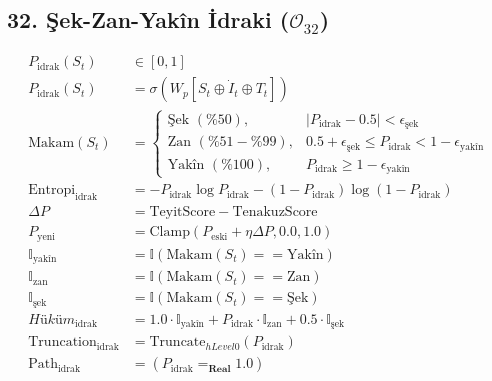\documentclass[11pt, a4paper]{article}
\begin{document}
\subsection{32. Şek-Zan-Yakîn İdraki ($\mathcal{O}_{32}$)}
\begin{align}
P_{\text{idrak}}(S_t) &\in [0, 1] \\
P_{\text{idrak}}(S_t) &= \sigma\left( W_p [S_t \oplus \dot{I}_t \oplus T_t] \right) \\
\text{Makam}(S_t) &= 
\begin{cases}
\text{Şek } (\%50), & |P_{\text{idrak}} - 0.5| < \epsilon_{\text{şek}} \\
\text{Zan } (\%51-\%99), & 0.5 + \epsilon_{\text{şek}} \le P_{\text{idrak}} < 1 - \epsilon_{\text{yakîn}} \\
\text{Yakîn } (\%100), & P_{\text{idrak}} \ge 1 - \epsilon_{\text{yakîn}}
\end{cases} \\
\text{Entropi}_{\text{idrak}} &= -P_{\text{idrak}} \log P_{\text{idrak}} - (1-P_{\text{idrak}}) \log (1-P_{\text{idrak}}) \\
\Delta P &= \text{TeyitScore} - \text{TenakuzScore} \\
P_{\text{yeni}} &= \text{Clamp}(P_{\text{eski}} + \eta \Delta P, 0.0, 1.0) \\
\mathbb{I}_{\text{yakîn}} &= \mathbb{I}(\text{Makam}(S_t) == \text{Yakîn}) \\
\mathbb{I}_{\text{zan}} &= \mathbb{I}(\text{Makam}(S_t) == \text{Zan}) \\
\mathbb{I}_{\text{şek}} &= \mathbb{I}(\text{Makam}(S_t) == \text{Şek}) \\
Hüküm_{\text{idrak}} &= 1.0 \cdot \mathbb{I}_{\text{yakîn}} + P_{\text{idrak}} \cdot \mathbb{I}_{\text{zan}} + 0.5 \cdot \mathbb{I}_{\text{şek}} \\
\text{Truncation}_{\text{idrak}} &= \text{Truncate}_{hLevel 0}(P_{\text{idrak}}) \\
\text{Path}_{\text{idrak}} &= (P_{\text{idrak}} =_{\mathbf{Real}} 1.0)
\end{align}
\end{document}
